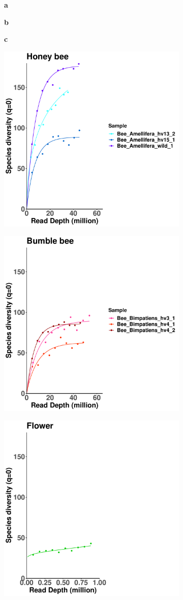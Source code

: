 \documentclass[11pt]{article}
\begin{document}
    \begin{figure}[H]
      \begin{subfigure}
        \centering
        \textbf{a}
      \end{subfigure}
      \hspace{0.32\linewidth}
      \begin{subfigure}
        \centering
        \textbf{b}
      \end{subfigure}
      \hspace{0.32\linewidth}
      \begin{subfigure}
        \centering
        \textbf{c}
      \end{subfigure}
      \newline
      \hfill
      \begin{subfigure}
        \centering
        \includegraphics[width=0.3\linewidth,height=0.3\linewidth]{../Figures/Honey_TaxonHill_0.pdf}
      \end{subfigure}
      \hfill
      \begin{subfigure}
        \centering
        \includegraphics[width=0.3\linewidth,height=0.3\linewidth]{../Figures/Bumble_TaxonHill_0.pdf}
      \end{subfigure}
      \hfill
      \begin{subfigure}
        \centering
        \includegraphics[width=0.3\linewidth,height=0.3\linewidth]{../Figures/Flower_TaxonHill_0.pdf}

\end{subfigure}
\end{figure}
\end{document}
